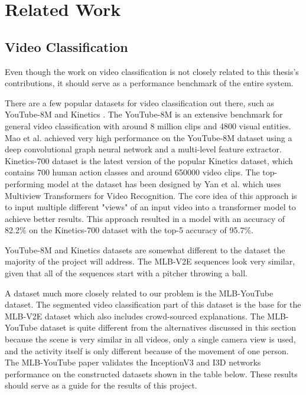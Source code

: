 \chapter{Related Work}


\section{Video Classification}

Even though the work on video classification is not closely related to this thesis's contributions, it should serve as a performance benchmark of the entire system.

There are a few popular datasets for video classification out there, such as YouTube-8M \cite{RefWorks:RefID:10-abu-el-haija2016youtube-8m:} and Kinetics \cite{RefWorks:RefID:9-carreira2017quo}.
The YouTube-8M \cite{RefWorks:RefID:10-abu-el-haija2016youtube-8m:} is an extensive benchmark for general video classification with around 8 million clips and 4800 visual entities.
Mao et al. \cite{RefWorks:RefID:4-mao2019hierarchical} achieved very high performance on the YouTube-8M dataset using a deep convolutional graph neural network and a multi-level feature extractor.
Kinetics-700 \cite{RefWorks:RefID:14-carreira2019short} dataset is the latest version of the popular Kinetics dataset, which contains 700 human action classes and around 650000 video clips.
The top-performing model at the dataset has been designed by Yan et al. which uses Multiview Transformers for Video Recognition. 
The core idea of this approach is to input multiple different "views" of an input video into a transformer model to achieve better results.
This approach resulted in a model with an accuracy of 82.2\% on the Kinetics-700 dataset with the top-5 accuracy of 95.7\%.

YouTube-8M and Kinetics datasets are somewhat different to the dataset the majority of the project will address.
The MLB-V2E sequences look very similar, given that all of the sequences start with a pitcher throwing a ball.

A dataset much more closely related to our problem is the MLB-YouTube \cite{RefWorks:RefID:3-piergiovanni2018fine-grained} dataset.
The segmented video classification part of this dataset is the base for the MLB-V2E \cite{RefWorks:RefID:16-2021automatic} dataset which also includes crowd-sourced explanations. 
The MLB-YouTube dataset is quite different from the alternatives discussed in this section because the scene is very similar in all videos, only a single camera view is used, and the activity itself is only different because of the movement of one person.
The MLB-YouTube paper validates the InceptionV3 \cite{RefWorks:RefID:49-szegedy2016rethinking} and I3D \cite{RefWorks:RefID:9-carreira2017quo} networks performance on the constructed datasets shown in the table below.
These results should serve as a guide for the results of this project.

